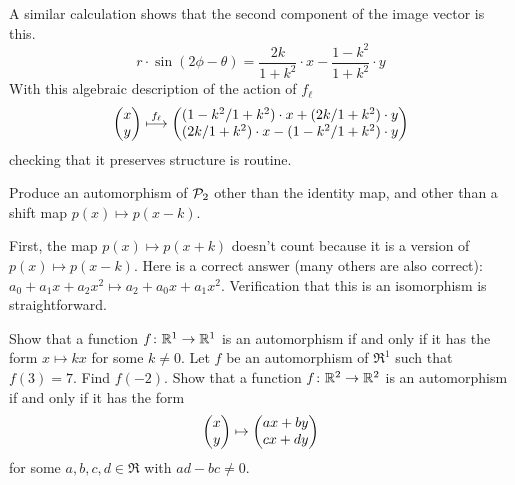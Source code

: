\begin{exercises}
\begin{answer}
\begin{exparts}
\begin{equation*}
          \end{equation*}
          A similar calculation shows that the second component of the image
          vector is this.
          \begin{equation*}
            r\cdot\sin(2\phi-\theta)=\frac{2k}{1+k^2}\cdot x
                                     -\frac{1-k^2}{1+k^2}\cdot y
          \end{equation*}
          With this algebraic description of the action of $f_\ell$
          \begin{equation*}
            \begin{pmatrix} x \\ y \end{pmatrix}
             \stackrel{f_\ell}{\longmapsto}
            \begin{pmatrix} (1-k^2/1+k^2)\cdot x
                                     +(2k/1+k^2)\cdot y \\ 
                   (2k/1+k^2)\cdot x
                                     -(1-k^2/1+k^2)\cdot y \end{pmatrix}  
          \end{equation*}
          checking that it preserves structure is routine.
      \end{exparts}  
    \end{answer}
  \item 
    Produce an automorphism of \( \mathcal{P}_2 \) other than the
    identity map, and other than a shift map $p(x)\mapsto p(x-k)$.
    \begin{answer}
       First, the map $p(x)\mapsto p(x+k)$ doesn't count
       because it is a version of $p(x)\mapsto p(x-k)$.
       Here is a correct answer (many others are also correct):
       \( a_0+a_1x+a_2x^2 \mapsto a_2+a_0x+a_1x^2 \).
       Verification that this is an isomorphism is straightforward.
    \end{answer}
  \item
    \begin{exparts}
      \partsitem Show that 
        a function \( \mbox{$f\colon \mathbb{R}^1\to \mathbb{R}^1$} \) is an automorphism
        if and only if it has the form \( x\mapsto kx \) for some
        \( k\neq 0 \).
      \partsitem Let \( f \) be an automorphism of \( \Re^1 \) such that
        \( f(3)=7 \).
        Find \( f(-2) \).
      \partsitem Show that a function \( \mbox{$f\colon \mathbb{R}^2\to \mathbb{R}^2$} \) is
        an automorphism if and only if it has the form
        \begin{equation*}
          \begin{pmatrix} x \\ y \end{pmatrix}
            \mapsto
          \begin{pmatrix} ax+by \\ cx+dy \end{pmatrix}
        \end{equation*}
        for some \( a,b,c,d\in\Re \) with \( ad-bc\neq 0 \).

\end{exparts}
\end{exercises}
